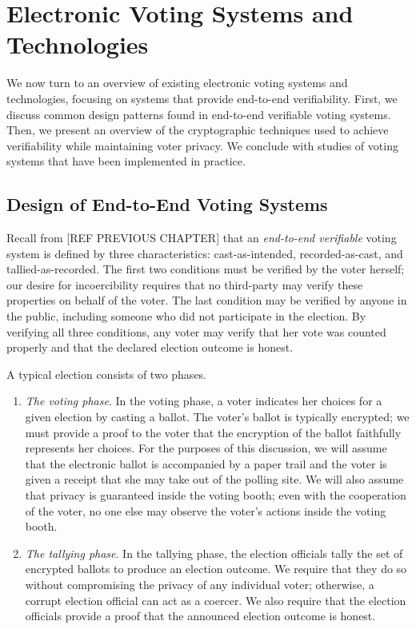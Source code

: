 \chapter{Electronic Voting Systems and Technologies}




We now turn to an overview of existing electronic voting systems and technologies, focusing on systems that provide end-to-end verifiability. First, we discuss common design patterns found in end-to-end verifiable voting systems. Then, we present an overview of the cryptographic techniques used to achieve verifiability while maintaining voter privacy. We conclude with studies of voting systems that have been implemented in practice.

\section{Design of End-to-End Voting Systems}

Recall from [REF PREVIOUS CHAPTER] that an \emph{end-to-end verifiable} voting system is defined by three characteristics: cast-as-intended, recorded-as-cast, and tallied-as-recorded. The first two conditions must be verified by the voter herself; our desire for incoercibility requires that no third-party may verify these properties on behalf of the voter. The last condition may be verified by anyone in the public, including someone who did not participate in the election. By verifying all three conditions, any voter may verify that her vote was counted properly and that the declared election outcome is honest.

A typical election consists of two phases.
\begin{enumerate}
\item \emph{The voting phase}. In the voting phase, a voter indicates her choices for a given election by casting a ballot. The voter's ballot is typically encrypted; we must provide a proof to the voter that the encryption of the ballot faithfully represents her choices. For the purposes of this discussion, we will assume that the electronic ballot is accompanied by a paper trail and the voter is given a receipt that she may take out of the polling site. We will also assume that privacy is guaranteed inside the voting booth; even with the cooperation of the voter, no one else may observe the voter's actions inside the voting booth.
\item \emph{The tallying phase}. In the tallying phase, the election officials tally the set of encrypted ballots to produce an election outcome. We require that they do so without compromising the privacy of any individual voter; otherwise, a corrupt election official can act as a coercer. We also require that the election officials provide a proof that the announced election outcome is honest.
\end{enumerate}

